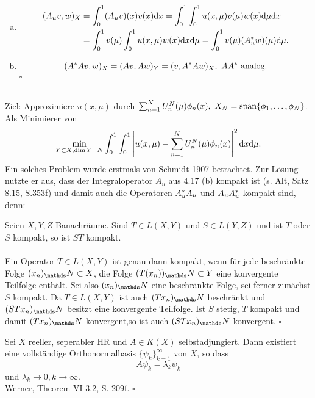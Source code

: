 \\
\begin{enumerate}[(b)]
	\item 
	\begin{align*}
	(A_uv,w)_X &= \int_{0}^{1} (A_uv)(x)v(x)\mathrm{d} x = \int_0^1\int_0^1 u(x,\mu)v(\mu)w(x)\mathrm{d}\mu\mathrm{d} x\\
	&= \int_0^1 v(\mu) \int_0^1 u(x,\mu)w(x)\mathrm{d} x\mathrm{d} \mu = \int_0^1 v(\mu)(A_u^\ast w)(\mu)\mathrm{d} \mu.
	\end{align*}
	\item
	\[
	(A^\ast A v,w)_X = (Av,Aw)_Y = (v,A^\ast A w)_X, ~AA^\ast \text{ analog.}
	\]
	\hfill $\square$
\end{enumerate}

\\
\uline{Ziel:} Approximiere $u(x,\mu)$ durch $\sum_{n=1}^{N}U_n^N(\mu)\phi_n(x),~X_N=\operatorname{span}\{\phi_1, \dots ,\phi_N\}$.
Als Minimierer von 
\[
\min\limits_{Y\subset X,\dim Y =N} \int_0^1\int_0^1\left\vert u(x,\mu)-\sum_{n=1}^{N}U_n^N(\mu)\phi_n(x)\right\vert^2\mathrm{d} x\mathrm{d} \mu.
\]
Ein solches Problem wurde erstmals von Schmidt 1907 betrachtet.
Zur Lösung nutzte er aus, dass der Integraloperator $A_u$ aus 4.17 (b) kompakt ist (s. Alt, Satz 8.15, S.353f) und damit auch die Operatoren $A_u^\ast A_u$ und $A_uA_u^\ast$ kompakt sind, denn:

Seien $X,Y,Z$ Banachräume.
Sind $T\in L(X,Y)$ und $S\in L(Y,Z)$ und ist $T$ oder $S$ kompakt, so ist $ST$ kompakt.\\

\\
Ein Operator $T\in L(X,Y)$ ist genau dann kompakt, wenn für jede beschränkte Folge $(x_n)_\N\subset X$, die Folge $(T(x_n))_\N\subset Y$ eine konvergente Teilfolge enthält.
Sei also $(x_n)_\N$ eine beschränkte Folge, sei ferner zunächst $S$ kompakt.
Da $T\in L(X,Y)$ ist auch $(Tx_n)_\N$ beschränkt und $(STx_n)_\N$ besitzt eine konvergente Teilfolge.
Ist $S$ stetig, $T$ kompakt und damit $(Tx_n)_\N$ konvergent,so ist auch $(STx_n)_\N$ konvergent.
\hfill $\square$

Sei $X$ reeller, seperabler HR und $A\in K(X)$ selbstadjungiert.
Dann existiert eine vollständige Orthonormalbasis $\{\psi_k\}_{k=1}^{\infty}$ von $X$, so dass
\[
A\psi_k = \lambda_k\psi_k
\]
und $\lambda_k\to 0,k\to \infty$.\\

 Werner, Theorem VI 3.2, S. 209f.
\hfill $\square$\\

